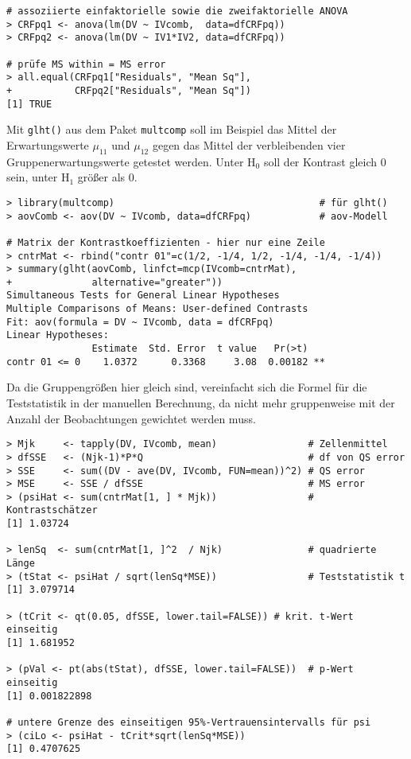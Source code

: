 \begin{lstlisting}
# assoziierte einfaktorielle sowie die zweifaktorielle ANOVA
> CRFpq1 <- anova(lm(DV ~ IVcomb,  data=dfCRFpq))
> CRFpq2 <- anova(lm(DV ~ IV1*IV2, data=dfCRFpq))

# prüfe MS within = MS error
> all.equal(CRFpq1["Residuals", "Mean Sq"],
+           CRFpq2["Residuals", "Mean Sq"])
[1] TRUE
\end{lstlisting}

Mit \lstinline!glht()! aus dem Paket \lstinline!multcomp! soll im Beispiel das Mittel der Erwartungswerte $\mu_{11}$ und $\mu_{12}$ gegen das Mittel der verbleibenden vier Gruppenerwartungswerte getestet werden. Unter $\text{H}_{0}$ soll der Kontrast gleich $0$ sein, unter $\text{H}_{1}$ größer als $0$.
\begin{lstlisting}
> library(multcomp)                                    # für glht()
> aovComb <- aov(DV ~ IVcomb, data=dfCRFpq)            # aov-Modell

# Matrix der Kontrastkoeffizienten - hier nur eine Zeile
> cntrMat <- rbind("contr 01"=c(1/2, -1/4, 1/2, -1/4, -1/4, -1/4))
> summary(glht(aovComb, linfct=mcp(IVcomb=cntrMat),
+              alternative="greater"))
Simultaneous Tests for General Linear Hypotheses
Multiple Comparisons of Means: User-defined Contrasts
Fit: aov(formula = DV ~ IVcomb, data = dfCRFpq)
Linear Hypotheses:
               Estimate  Std. Error  t value   Pr(>t)
contr 01 <= 0    1.0372      0.3368     3.08  0.00182 **
\end{lstlisting}

Da die Gruppengrößen hier gleich sind, vereinfacht sich die Formel für die Teststatistik in der manuellen Berechnung, da nicht mehr gruppenweise mit der Anzahl der Beobachtungen gewichtet werden muss.
\begin{lstlisting}
> Mjk     <- tapply(DV, IVcomb, mean)                # Zellenmittel
> dfSSE   <- (Njk-1)*P*Q                             # df von QS error
> SSE     <- sum((DV - ave(DV, IVcomb, FUN=mean))^2) # QS error
> MSE     <- SSE / dfSSE                             # MS error
> (psiHat <- sum(cntrMat[1, ] * Mjk))                # Kontrastschätzer
[1] 1.03724

> lenSq  <- sum(cntrMat[1, ]^2  / Njk)               # quadrierte Länge
> (tStat <- psiHat / sqrt(lenSq*MSE))                # Teststatistik t
[1] 3.079714

> (tCrit <- qt(0.05, dfSSE, lower.tail=FALSE)) # krit. t-Wert einseitig
[1] 1.681952

> (pVal <- pt(abs(tStat), dfSSE, lower.tail=FALSE))  # p-Wert einseitig
[1] 0.001822898

# untere Grenze des einseitigen 95%-Vertrauensintervalls für psi
> (ciLo <- psiHat - tCrit*sqrt(lenSq*MSE))
[1] 0.4707625
\end{lstlisting}

